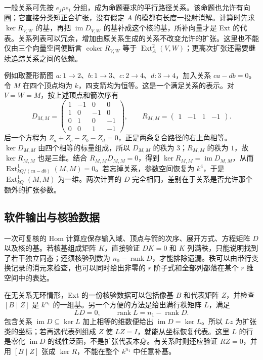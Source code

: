 一般关系可先按 \(e_j\rho e_i\) 分组，成为命题要求的平行路径关系。该命题也允许有向圈；它直接分类短正合扩张，没有假定 \(A\) 的模都有长度一投射消解。计算时先求 \(\ker R_{V,W}\) 的基，再把 \(\operatorname{im}D_{V,W}\) 的基补成这个核的基，所补向量才是 Ext 的代表。关系列表可以冗余，增加由原关系生成的关系不改变允许的扩张。这里也不能仅由三个向量空间便断言 \(\operatorname{coker}R_{V,W}\) 等于 \(\operatorname{Ext}_A^2(V,W)\)；更高次扩张还需要继续追踪关系之间的依赖。

\ProseParagraphBreak
例如取菱形箭图 \(a:1\to2\)、\(b:1\to3\)、\(c:2\to4\)、\(d:3\to4\)，加入关系 \(ca-db=0\)。令 \(M\) 在四个顶点均为 \(k\)，四支箭均为恒等。这是一个满足关系的表示。对 \(V=W=M\)，按上述顶点和箭次序有
\[
	D_{M,M}=\begin{pmatrix}
		1&-1&0&0\\1&0&-1&0\\0&1&0&-1\\0&0&1&-1
	\end{pmatrix},\qquad
	R_{M,M}=\begin{pmatrix}1&-1&1&-1\end{pmatrix}.
\]
后一个方程为 \(Z_a+Z_c-Z_b-Z_d=0\)，正是两条复合路径的右上角相等。\(\ker D_{M,M}\) 由四个相等的标量组成，所以 \(D_{M,M}\) 的秩为 \(3\)；\(R_{M,M}\) 的秩为 \(1\)，故 \(\ker R_{M,M}\) 也是三维。结合 \(R_{M,M}D_{M,M}=0\)，得到 \(\ker R_{M,M}=\operatorname{im}D_{M,M}\)，从而 \(\operatorname{Ext}_{kQ/(ca-db)}^1(M,M)=0\)。若忘掉关系，参数空间恢复为 \(k^4\)，于是 \(\operatorname{Ext}_{kQ}^1(M,M)\) 为一维。两次计算的 \(D\) 完全相同，差别在于关系是否允许那个额外的扩张参数。

\subsection{软件输出与核验数据}
\label{b5:subsec:0906:03}

一次可复核的 Hom 计算应保存输入域、顶点与箭的次序、展开方式、方程矩阵 \(D\) 以及核的基。若核基组成矩阵 \(K\)，直接验证 \(DK=0\) 和 \(K\) 列满秩，只能说明找到了若干独立同态；还须核验列数为 \(n_0-\operatorname{rank}D\)，才能排除遗漏。秩可以由带行变换记录的消元来检查，也可以同时给出非零的 \(r\) 阶子式和全部列都落在某个 \(r\) 维空间中的表达。

\ProseParagraphBreak
在无关系无环情形，Ext 的一份核验数据可以包括像基 \(B\) 和代表矩阵 \(Z\)，并检查 \([B\mid Z]\) 是 \(k^{n_1}\) 的一组基。另一个方便的方法是给出满行秩矩阵 \(L\)，满足
\[
	LD=0,\qquad \operatorname{rank}L=n_1-\operatorname{rank}D.
\]
包含关系 \(\operatorname{im}D\subseteq\ker L\) 加上相等的维数便给出 \(\operatorname{im}D=\ker L\)。所以 \(Lz\) 为扩张类的坐标；若再选代表列组成 \(Z\) 使 \(LZ=I\)，就能从坐标恢复代表。这里 \(L\) 的行是零化 \(\operatorname{im}D\) 的线性泛函，不是扩张代表本身。有关系时则还应验证 \(RZ=0\)，并用 \([B\mid Z]\) 张成 \(\ker R\)，不能在整个 \(k^{n_1}\) 中任意补基。

